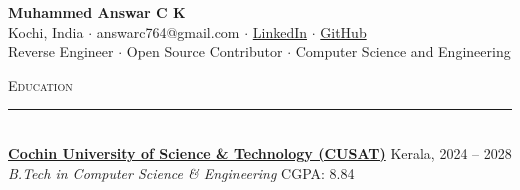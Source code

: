 \documentclass[a4paper,11pt]{article}
\newcommand{\header}[1]{\vfill{\large\textsc{#1}}\\[-8pt]\rule{\linewidth}{0.4pt}\\[2pt]}
\begin{document}
\begin{center}
    {\Huge \textbf{Muhammed Answar C K}}\\[6pt]
    Kochi, India $\cdot$ answarc764@gmail.com $\cdot$ \href{https://www.linkedin.com/in/answarck/}{LinkedIn} $\cdot$ \href{https://github.com/answarck/}{GitHub}\\[4pt]
    Reverse Engineer $\cdot$ Open Source Contributor $\cdot$ Computer Science and Engineering
\end{center}

\header{Education}
\textbf{\href{https://www.cusat.ac.in/}{Cochin University of Science \& Technology (CUSAT)}} \hfill Kerala, 2024 -- 2028\\
\textit{B.Tech in Computer Science \& Engineering} \hfill CGPA: 8.84
\end{document}
